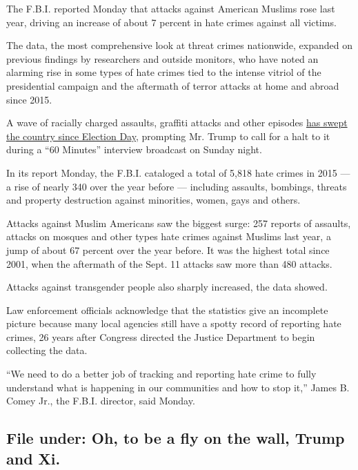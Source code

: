 The F.B.I. reported Monday that attacks against American Muslims rose
last year, driving an increase of about 7 percent in hate crimes against
all victims.

The data, the most comprehensive look at threat crimes nationwide,
expanded on previous findings by researchers and outside monitors, who
have noted an alarming rise in some types of hate crimes tied to the
intense vitriol of the presidential campaign and the aftermath of terror
attacks at home and abroad since 2015.

A wave of racially charged assaults, graffiti attacks and other episodes
\href{http://www.nytimes.com/2016/11/12/us/reports-of-bias-based-attacks-tick-upward-after-election.html?_r=1}{has
swept the country since Election Day}, prompting Mr. Trump to call for a
halt to it during a ``60 Minutes'' interview broadcast on Sunday night.

In its report Monday, the F.B.I. cataloged a total of 5,818 hate crimes
in 2015 --- a rise of nearly 340 over the year before --- including
assaults, bombings, threats and property destruction against minorities,
women, gays and others.

Attacks against Muslim Americans saw the biggest surge: 257 reports of
assaults, attacks on mosques and other types hate crimes against Muslims
last year, a jump of about 67 percent over the year before. It was the
highest total since 2001, when the aftermath of the Sept. 11 attacks saw
more than 480 attacks.

Attacks against transgender people also sharply increased, the data
showed.

Law enforcement officials acknowledge that the statistics give an
incomplete picture because many local agencies still have a spotty
record of reporting hate crimes, 26 years after Congress directed the
Justice Department to begin collecting the data.

``We need to do a better job of tracking and reporting hate crime to
fully understand what is happening in our communities and how to stop
it,'' James B. Comey Jr., the F.B.I. director, said Monday.

\hypertarget{file-under-oh-to-be-a-fly-on-the-wall-trump-and-xi}{%
\subsection{File under: Oh, to be a fly on the wall, Trump and
Xi.}\label{file-under-oh-to-be-a-fly-on-the-wall-trump-and-xi}}

